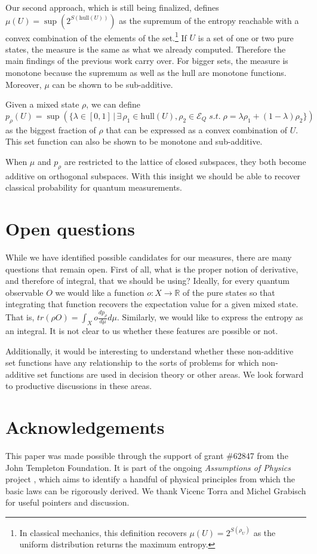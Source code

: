 \documentclass{styles/svproc}
\newcommand\hull{\mathrm{hull}}
\begin{document}
Our second approach, which is still being finalized\cite{aop-book}, defines $\mu(U) = \sup(2^{S(\hull(U))})$ as the supremum of the entropy reachable with a convex combination of the elements of the set.\footnote{In classical mechanics, this definition recovers $\mu(U) = 2^{S(\rho_U)}$ as the uniform distribution returns the maximum entropy.} If $U$ is a set of one or two pure states, the measure is the same as what we already computed. Therefore the main findings of the previous work carry over. For bigger sets, the measure is monotone because the supremum as well as the hull are monotone functions. Moreover, $\mu$ can be shown to be sub-additive.

Given a mixed state $\rho$, we can define $p_{\rho}(U) = \sup(\{ \lambda \in [0,1] \, | \, \exists \, \rho_1 \in \hull(U), \rho_2 \in \mathcal{E}_Q \; s.t. \;  \rho = \lambda \rho_1 + (1-\lambda) \rho_2 \})$ as the biggest fraction of $\rho$ that can be expressed as a convex combination of $U$. This set function can also be shown to be monotone and sub-additive.

When $\mu$ and $p_\rho$ are restricted to the lattice of closed subspaces, they both become additive on orthogonal subspaces. With this insight we should be able to recover classical probability for quantum measurements.

\section{Open questions}

While we have identified possible candidates for our measures, there are many questions that remain open. First of all, what is the proper notion of derivative, and therefore of integral, that we should be using? Ideally, for every quantum observable $O$ we would like a function $o : X \to \mathbb{R}$ of the pure states so that integrating that function recovers the expectation value for a given mixed state. That is, $tr(\rho O) = \int_X o \frac{dp_\rho}{d\mu} d\mu$. Similarly, we would like to express the entropy as an integral. It is not clear to us whether these features are possible or not.

Additionally, it would be interesting to understand whether these non-additive set functions have any relationship to the sorts of problems for which non-additive set functions are used in decision theory or other areas. We look forward to productive discussions in these areas.

\section{Acknowledgements}

This paper was made possible through the support of grant \#62847 from the John Templeton Foundation. It is part of the ongoing \textit{Assumptions of Physics} project \cite{aop-book}, which aims to identify a handful of physical principles from which the basic laws can be rigorously derived.  We thank Vicenc Torra and Michel Grabisch for useful pointers and discussion.

%
%


\end{document}
